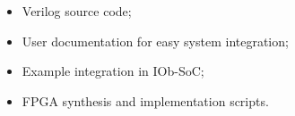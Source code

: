 \begin{itemize}
\item Verilog source code;
\item User documentation for easy system integration;
\item Example integration in IOb-SoC;
\item FPGA synthesis and implementation scripts.
\end{itemize}
